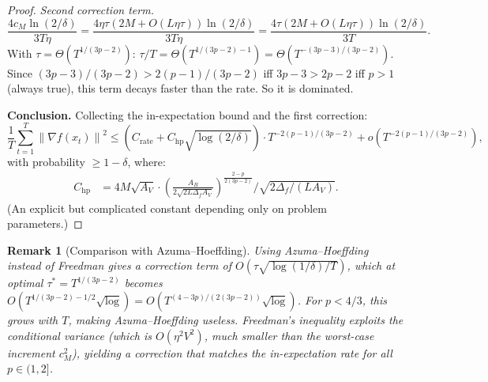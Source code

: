 \documentclass[11pt]{article}
\newtheorem{remark}[theorem]{Remark}
\theoremstyle{definition}
\newcommand{\norm}[1]{\left\| #1 \right\|}
\begin{document}
\begin{proof}
\emph{Second correction term.}
\[
  \frac{4c_M\ln(2/\delta)}{3T\eta}
  = \frac{4\eta\tau(2M + O(L\eta\tau))\ln(2/\delta)}{3T\eta}
  = \frac{4\tau(2M + O(L\eta\tau))\ln(2/\delta)}{3T}.
\]
With $\tau = \Theta(T^{1/(3p-2)})$:
$\tau/T = \Theta(T^{1/(3p-2) - 1}) = \Theta(T^{-(3p-3)/(3p-2)})$.
Since $(3p-3)/(3p-2) > 2(p-1)/(3p-2)$ iff $3p - 3 > 2p - 2$ iff $p > 1$
(always true), this term decays faster than the rate. So it is dominated.

\textbf{Conclusion.}
Collecting the in-expectation bound and the first correction:
\[
  \frac{1}{T}\sum_{t=1}^T \norm{\nabla f(x_t)}^2
  \leq \left(C_{\mathrm{rate}} + C_{\mathrm{hp}}\sqrt{\log(2/\delta)}\right)
    \cdot T^{-2(p-1)/(3p-2)}
  + o\!\left(T^{-2(p-1)/(3p-2)}\right),
\]
with probability $\geq 1 - \delta$, where:
\begin{align*}
  C_{\mathrm{hp}} &= 4M\sqrt{A_V} \cdot
    \left(\frac{A_B}{2\sqrt{2L\Delta_f A_V}}\right)^{\frac{2-p}{2(3p-2)}}
    \bigg/ \sqrt{2\Delta_f / (LA_V)}.
\end{align*}
(An explicit but complicated constant depending only on problem parameters.)
\end{proof}

\begin{remark}[Comparison with Azuma--Hoeffding]
Using Azuma--Hoeffding instead of Freedman gives a correction term of
$O(\tau\sqrt{\log(1/\delta)/T})$, which at optimal $\tau^* = T^{1/(3p-2)}$
becomes $O(T^{1/(3p-2) - 1/2}\sqrt{\log}) = O(T^{(4-3p)/(2(3p-2))}\sqrt{\log})$.
For $p < 4/3$, this \emph{grows} with $T$, making Azuma--Hoeffding useless.
Freedman's inequality exploits the conditional variance (which is $O(\eta^2 V^2)$,
much smaller than the worst-case increment $c_M^2$), yielding a correction
that matches the in-expectation rate for all $p \in (1, 2]$.
\end{remark}
\end{document}
